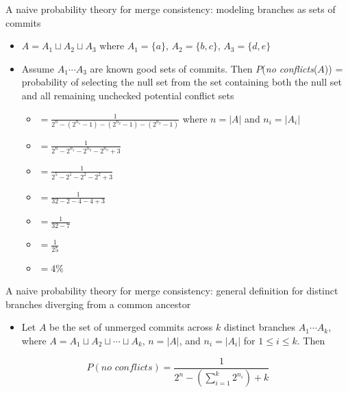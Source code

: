 \documentclass{beamer}
\begin{document}
	\begin{frame}{A naive probability theory for merge consistency: modeling branches as sets of commits}
		\begin{itemize}
			\item $A = A_1 \sqcup A_2 \sqcup A_3$ where $A_1 = \{a\}$, $A_2 = \{b, c\}$, $A_3 = \{d, e\}$ \pause
			\item Assume $A_1 \cdots A_3$ are known good sets of commits. Then $P$(\textit{no conflicts}($A$)) = probability of selecting the null set from the set containing both the null set and all remaining unchecked potential conflict sets  \pause
			\begin{itemize}
				\item $= \frac{1}{2^n - (2^{n_1} - 1) - (2^{n_2} - 1) - (2^{n_3} - 1)}$ where $n = |A|$ and $n_i = |A_i|$ \pause
				\item $= \frac{1}{2^n - 2^{n_1} - 2^{n_2} - 2^{n_3} + 3}$ \pause
				\item $= \frac{1}{2^5 - 2^1 - 2^2 - 2^2 + 3}$ \pause 
				\item $ = \frac{1}{32 - 2 - 4 - 4 + 3}$ \pause 
				\item $= \frac{1}{32 - 7}$ \pause
				\item $= \frac{1}{25}$ \pause
				\item $= 4\%$ \pause		
			\end{itemize}
		\end{itemize}
	\end{frame}
	\begin{frame}{A naive probability theory for merge consistency: general definition for distinct branches diverging from a common ancestor}
		\begin{itemize}
			\item Let $A$ be the set of unmerged commits across $k$ distinct branches $A_1 \cdots A_k$, where $A = A_1 \sqcup A_2 \sqcup \cdots \sqcup A_k$, $n = |A|$, and $n_i = |A_i|$ for $1 \leq i \leq k$. Then \pause
		\end{itemize}
		\[
		P(\textit{no conflicts}) = \frac{1}{2^n - (\sum_{i=1}^k2^{n_i}) + k}
		\]
	\end{frame}
\end{document}
